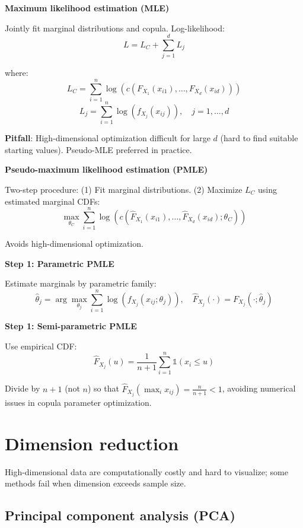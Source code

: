 \documentclass[12pt,a4paper]{article}
\begin{document}
\textbf{Maximum likelihood estimation (MLE)}

Jointly fit marginal distributions and copula. Log-likelihood:
\[
L = L_C + \sum_{j=1}^d L_j
\]

where:
\[
L_C = \sum_{i=1}^n \log\left(c(F_{X_1}(x_{i1}), \ldots, F_{X_d}(x_{id}))\right)
\]
\[
L_j = \sum_{i=1}^n \log(f_{X_j}(x_{ij})), \quad j=1,\ldots,d
\]

\textbf{Pitfall}: High-dimensional optimization difficult for large $d$ (hard to find suitable starting values). Pseudo-MLE preferred in practice.

\vspace{0.5em}

\textbf{Pseudo-maximum likelihood estimation (PMLE)}

Two-step procedure: (1) Fit marginal distributions. (2) Maximize $L_C$ using estimated marginal CDFs:
\[
\max_{\theta_C} \sum_{i=1}^n \log\left(c(\hat{F}_{X_1}(x_{i1}), \ldots, \hat{F}_{X_d}(x_{id}); \theta_C)\right)
\]

Avoids high-dimensional optimization.

\vspace{0.5em}

\textbf{Step 1: Parametric PMLE}

Estimate marginals by parametric family:
\[
\hat{\theta}_j = \arg\max_{\theta_j} \sum_{i=1}^n \log(f_{X_j}(x_{ij}; \theta_j)), \quad \hat{F}_{X_j}(\cdot) = F_{X_j}(\cdot; \hat{\theta}_j)
\]

\vspace{0.5em}

\textbf{Step 1: Semi-parametric PMLE}

Use empirical CDF:
\[
\hat{F}_{X_j}(u) = \frac{1}{n+1}\sum_{i=1}^n \mathbb{1}(x_i \leq u)
\]

Divide by $n+1$ (not $n$) so that $\hat{F}_{X_j}(\max_i x_{ij}) = \frac{n}{n+1} < 1$, avoiding numerical issues in copula parameter optimization.



\section{Dimension reduction}
High-dimensional data are computationally costly and hard to visualize; some methods fail when dimension exceeds sample size. 

\subsection{Principal component analysis (PCA)}
\end{document}
